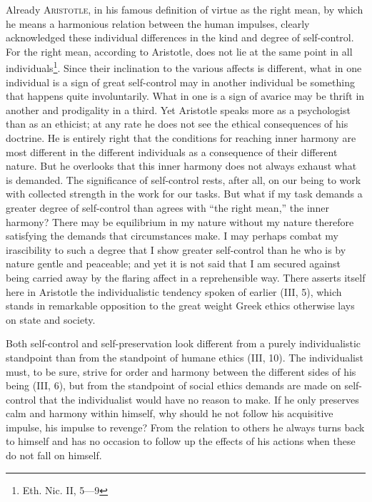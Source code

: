 \documentclass[12pt,a4paper,openany]{book}
\newcommand{\opage}[1]{\marginnote{\footnotesize\textit{[#1]}}}
\begin{document}
Already \textsc{Aristotle}, in his famous definition of virtue as the right mean, by which he means a harmonious
relation between the human impulses, clearly acknowledged these individual differences in the kind and degree of
self-control. For the right mean, according to Aristotle, does not lie at the same point in all
individuals\footnote[1]{Eth. Nic. II, 5---9}. Since their inclination to the various affects is different, what in
one individual is a sign of great self-control may in another individual be something that happens quite
involuntarily. What in one is a sign of avarice may be thrift in another and prodigality in a third. Yet Aristotle
speaks more as a psychologist than as an ethicist; at any rate he does not see the ethical consequences of his
doctrine. He is entirely right that the conditions for reaching inner harmony are most different in the different
individuals as a consequence of their different nature. But he overlooks that this inner harmony does not always
exhaust what is demanded. The significance of self-control rests, after all, on our being to work with collected
strength in the work for our tasks. But what if my task demands a greater degree of self-control than agrees with
``the right mean,'' the inner harmony? There may be equilibrium in my nature without my nature therefore satisfying
the demands that circumstances make. I may perhaps combat my irascibility to such a degree that I show greater
self-control than he who is by nature gentle and peaceable; and yet it is not said that I am secured against being
carried away by the flaring affect in a reprehensible way. There asserts itself here in Aristotle the individualistic
tendency spoken of earlier (III, 5), which stands in remarkable opposition to the great weight Greek ethics
otherwise lays on state and society.

\opage{224}Both self-control and self-preservation look different from a purely individualistic standpoint than from
the standpoint of humane ethics (III, 10). The individualist must, to be sure, strive for order and harmony between
the different sides of his being (III, 6), but from the standpoint of social ethics demands are made on self-control
that the individualist would have no reason to make. If he only preserves calm and harmony within himself, why should
he not follow his acquisitive impulse, his impulse to revenge? From the relation to others he always turns back to
himself and has no occasion to follow up the effects of his actions when these do not fall on himself.
\end{document}
